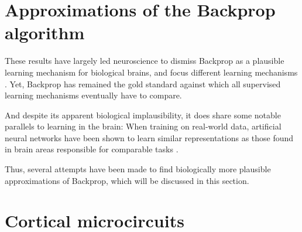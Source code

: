 


\section{Approximations of the Backprop algorithm}

These results have largely led neuroscience to dismiss Backprop as a plausible learning mechanism for biological brains,
and focus different learning mechanisms .
Yet, Backprop has remained the gold standard against which all supervised learning mechanisms eventually have to compare.

And despite its apparent biological implausibility, it does share some notable parallels to learning in the brain:
When training on real-world data, artificial neural networks have been shown to learn similar representations as those 
found in brain areas responsible for comparable tasks \cite{whittington2019theories,Yamins2016}. 

Thus, several attempts have been made to find biologically more plausible approximations of Backprop, which will be
discussed in this section.
\newline





\section{Cortical microcircuits}
